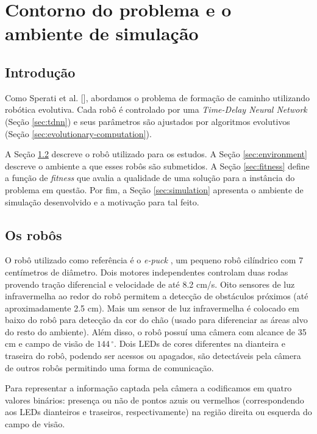 \chapter{Contorno do problema e o ambiente de simulação}
\label{cha:problem-limits}

\section{Introdução}

Como Sperati et al. [\cite{sperati2011path}], abordamos o problema de formação de caminho utilizando robótica evolutiva. Cada robô é controlado por uma \textit{Time-Delay Neural Network} (Seção \ref{sec:tdnn}) e seus parâmetros são ajustados por algoritmos evolutivos (Seção \ref{sec:evolutionary-computation}).

A Seção \ref{sec:robots} descreve o robô utilizado para os estudos. A Seção \ref{sec:environment} descreve o ambiente a que esses robôs são submetidos. A Seção \ref{sec:fitness} define a função de \textit{fitness} que avalia a qualidade de uma solução para a instância do problema em questão. Por fim, a Seção \ref{sec:simulation} apresenta o ambiente de simulação desenvolvido e a motivação para tal feito.

\section{Os robôs}
\label{sec:robots}

O robô utilizado como referência é o \textit{e-puck} \cite{mondada2009epuck}, um pequeno robô cilíndrico com 7 centímetros de diâmetro. Dois motores independentes controlam duas rodas provendo tração diferencial e velocidade de até 8.2 cm/s. Oito sensores de luz infravermelha ao redor do robô permitem a detecção de obstáculos próximos (até aproximadamente 2.5 cm). Mais um sensor de luz infravermelha é colocado em baixo do robô para detecção da cor do chão (usado para diferenciar as áreas alvo do resto do ambiente). Além disso, o robô possuí uma câmera com alcance de 35 cm e campo de visão de $144\,^{\circ}$. Dois LEDs de cores diferentes na dianteira e traseira do robô, podendo ser acessos ou apagados, são detectáveis pela câmera de outros robôs permitindo uma forma de comunicação.

Para representar a informação captada pela câmera a codificamos em quatro valores binários: presença ou não de pontos azuis ou vermelhos (correspondendo aos LEDs dianteiros e traseiros, respectivamente) na região direita ou esquerda do campo de visão.

